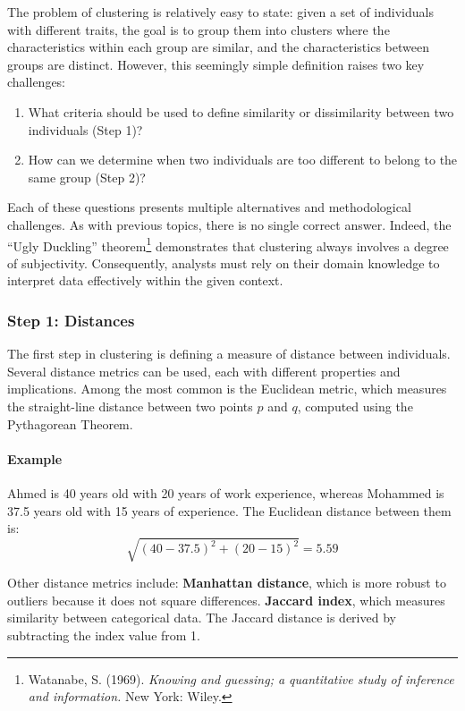 \documentclass[
]{article}
\providecommand{\tightlist}{%
  \setlength{\itemsep}{0pt}\setlength{\parskip}{0pt}}
\begin{document}
The problem of clustering is relatively easy to state: given a set of
individuals with different traits, the goal is to group them into
clusters where the characteristics within each group are similar, and
the characteristics between groups are distinct. However, this seemingly
simple definition raises two key challenges:

\begin{enumerate}
\def\labelenumi{\arabic{enumi}.}
\tightlist
\item
  What criteria should be used to define similarity or dissimilarity
  between two individuals (Step 1)?
\item
  How can we determine when two individuals are too different to belong
  to the same group (Step 2)?
\end{enumerate}

Each of these questions presents multiple alternatives and
methodological challenges. As with previous topics, there is no single
correct answer. Indeed, the ``Ugly Duckling'' theorem\footnote{Watanabe,
  S. (1969). \emph{Knowing and guessing; a quantitative study of
  inference and information.} New York: Wiley.} demonstrates that
clustering always involves a degree of subjectivity. Consequently,
analysts must rely on their domain knowledge to interpret data
effectively within the given context.

\subsubsection{Step 1: Distances}\label{step-1-distances}

The first step in clustering is defining a measure of distance between
individuals. Several distance metrics can be used, each with different
properties and implications. Among the most common is the Euclidean
metric, which measures the straight-line distance between two points
\(p\) and \(q\), computed using the Pythagorean Theorem.

\paragraph{Example}\label{example}

Ahmed is 40 years old with 20 years of work experience, whereas Mohammed
is 37.5 years old with 15 years of experience. The Euclidean distance
between them is: \[ \sqrt{(40 - 37.5)^2 + (20 - 15)^2} = 5.59 \]

Other distance metrics include: \textbf{Manhattan distance}, which is
more robust to outliers because it does not square differences.
\textbf{Jaccard index}, which measures similarity between categorical
data. The Jaccard distance is derived by subtracting the index value
from 1.
\end{document}
